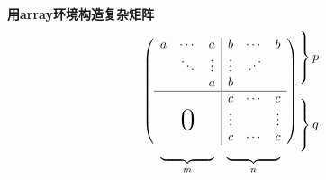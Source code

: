 \documentclass{ctexart}
\newcommand{\adots}{\mathinner{\mkern2mu\raisebox{0.1em}{.}\mkern2mu\raisebox{0.4em}{.}\mkern2mu\raisebox{0.7em}{.}\mkern1mu}}
\begin{document}
   \textbf{用array环境构造复杂矩阵}
   \[
   \begin{array}
       {c@{\hspace{-5pt}}l}
       \left(
       \begin{array}{ccc|ccc}
           a & \cdots & a & b & \cdots & b \\
           & \ddots & \vdots & \vdots & \adots \\
           &        & a & b \\ \hline
           &        &   & c & \cdots & c \\
           &        &   & \vdots & & \vdots \\
           \multicolumn{3}{c|}{\raisebox{2ex}[0pt]{\Huge 0}} & c & \cdots & c
       \end{array}    
       \right)
       &
       \begin{array}{l}
        \left. \rule{0mm}{8mm}\right\}p\\
        \\
        \left. \rule{0mm}{8mm}\right\}q
       \end{array}
       \\[-5pt]
       \begin{array}{cc}
           \underbrace{\rule{15mm}{0mm}}_m & 
           \underbrace{\rule{15mm}{0mm}}_n
       \end{array}
   \end{array}    
   \]
\end{document}
